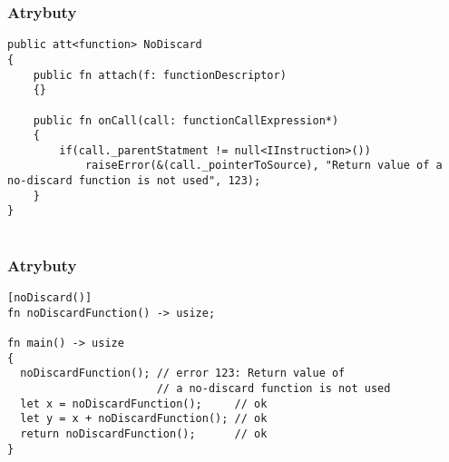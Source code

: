 \begin{frame}[fragile]
	\frametitle{Atrybuty}

	\begin{lstlisting}
public att<function> NoDiscard
{
	public fn attach(f: functionDescriptor)
	{}

	public fn onCall(call: functionCallExpression*)
	{
		if(call._parentStatment != null<IInstruction>())
			raiseError(&(call._pointerToSource), "Return value of a no-discard function is not used", 123);
	}
}
		
	\end{lstlisting}

\end{frame}

\begin{frame}[fragile]
	\frametitle{Atrybuty}

	\begin{lstlisting}
[noDiscard()]
fn noDiscardFunction() -> usize;

fn main() -> usize
{
  noDiscardFunction(); // error 123: Return value of
                       // a no-discard function is not used
  let x = noDiscardFunction();     // ok
  let y = x + noDiscardFunction(); // ok
  return noDiscardFunction();      // ok
}
		
	\end{lstlisting}

\end{frame}


